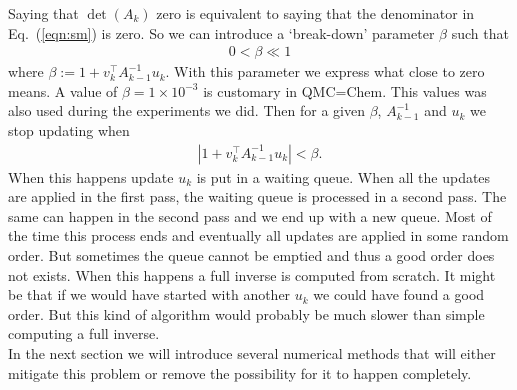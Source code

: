 \documentclass[11pt]{article}
\numberwithin{figure}{section}
\numberwithin{table}{section}
\begin{document}
			Saying that $\det\left(A_k\right)$ zero is equivalent to saying that the denominator in Eq.~(\ref{eqn:sm}) is zero. So we can introduce a `break-down' parameter $\beta$ such that
			\begin{align}\label{eqn:break-down-parameter}
				0 < \beta \ll 1
			\end{align}
			where $\beta := 1+v_k^\top A^{-1}_{k-1}u_k$. With this parameter we express what close to zero means. A value of $\beta = 1\times 10^{-3}$ is customary in QMC=Chem. This values was also used during the experiments we did.  Then for a given $\beta$, $A^{-1}_{k-1}$ and $u_k$ we stop updating when
			\begin{align}\label{eqn:break-down-condition}
				\left|1+v_k^\top A^{-1}_{k-1}u_k\right| < \beta.
			\end{align}
			When this happens update $u_k$ is put in a waiting queue. When all the updates are applied in the first pass, the waiting queue is processed in a second pass. The same can happen in the second pass and we end up with a new queue. Most of the time this process ends and eventually all updates are applied in some random order. But sometimes the queue cannot be emptied and thus a good order does not exists. When this happens a full inverse is computed from scratch. It might be that if we would have started with another $u_k$ we could have found a good order. But this kind of algorithm would probably be much slower than simple computing a full inverse.\\
			
			In the next section we will introduce several numerical methods that will either mitigate this problem or remove the possibility for it to happen completely.
					
			
 			
\end{document}
